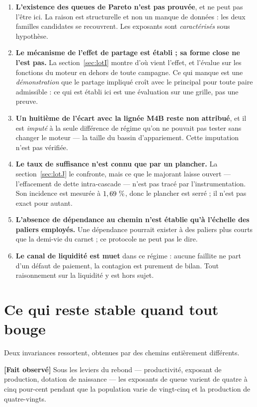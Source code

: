 \documentclass[11pt,a4paper]{article}
\newcommand{\fait}{\textbf{[Fait observé]}}
\begin{document}
\begin{enumerate}
\item \textbf{L'existence des queues de Pareto n'est pas prouvée}, et ne peut
      pas l'être ici. La raison est structurelle et non un manque de données :
      les deux familles candidates se recouvrent. Les exposants sont
      \emph{caractérisés} sous hypothèse.
\item \textbf{Le mécanisme de l'effet de partage est établi ; sa forme
      close ne l'est pas.} La section~\ref{sec:lotI} montre d'où vient
      l'effet, et l'évalue sur les fonctions du moteur en dehors de toute
      campagne. Ce qui manque est une \emph{démonstration} que le partage
      impliqué croît avec le principal pour toute paire admissible : ce qui
      est établi ici est une évaluation sur une grille, pas une preuve.
\item \textbf{Un huitième de l'écart avec la lignée M4B reste non attribué}, et
      il est \emph{imputé} à la seule différence de régime qu'on ne pouvait
      pas tester sans changer le moteur --- la taille du bassin
      d'appariement. Cette imputation n'est pas vérifiée.
\item \textbf{Le taux de suffisance n'est connu que par un plancher.} La
      section~\ref{sec:lotJ} le confronte, mais ce que le majorant laisse
      ouvert --- l'effacement de dette intra-cascade --- n'est pas tracé par
      l'instrumentation. Son incidence est mesurée à
      $1,69~\%$, donc le plancher est serré ; il n'est pas
      exact pour autant.
\item \textbf{L'absence de dépendance au chemin n'est établie qu'à l'échelle
      des paliers employés.} Une dépendance pourrait exister à des paliers
      plus courts que la demi-vie du carnet ; ce protocole ne peut pas le
      dire.
\item \textbf{Le canal de liquidité est muet} dans ce régime : aucune
      faillite ne part d'un défaut de paiement, la contagion est purement de
      bilan. Tout raisonnement sur la liquidité y est hors sujet.
\end{enumerate}

\section{Ce qui reste stable quand tout bouge}

Deux invariances ressortent, obtenues par des chemins entièrement différents.

\fait{} Sous les leviers du rebond --- productivité, exposant de production,
dotation de naissance --- les exposants de queue varient de quatre à cinq
pour-cent pendant que la population varie de vingt-cinq et la production de
quatre-vingts.
\end{document}

